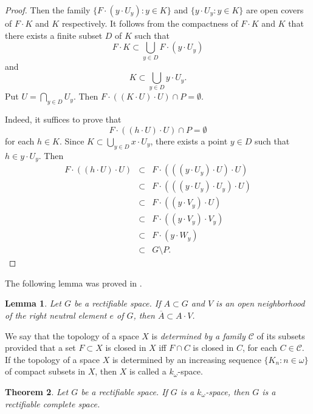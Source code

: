 \documentclass[psamsfonts,fceqn,leqno]{amsart}
\newtheorem{theorem}{Theorem}[section]
\newtheorem{lemma}[theorem]{Lemma}
\theoremstyle{definition}
\begin{document}
\begin{proof}
Then the family $\{F\cdot (y\cdot U_{y}): y\in K\}$ and $\{y\cdot U_{y}: y\in K\}$ are open covers of $F\cdot K$ and $K$ respectively.  It follows from the compactness of $F\cdot K$ and $K$ that there exists a finite subset $D$ of $K$ such that $$F\cdot K\subset \bigcup_{y\in D}F\cdot (y\cdot U_{y})$$ and $$K\subset  \bigcup_{y\in D}y\cdot U_{y}.$$ Put $U=\bigcap_{y\in D} U_{y}$. Then $F\cdot ((K\cdot U)\cdot U)\cap P=\emptyset.$

Indeed, it suffices to prove that $$F\cdot ((h\cdot U)\cdot U)\cap P=\emptyset$$ for each $h\in K$. Since $K\subset \bigcup_{y\in D}x\cdot U_{y}$, there exists a point $y\in D$ such that $h\in y\cdot U_{y}$. Then
\begin{eqnarray}
F\cdot ((h\cdot U)\cdot U)&\subset&F\cdot (((y\cdot U_{y})\cdot U)\cdot U) \nonumber\\
&\subset&F\cdot (((y\cdot U_{y})\cdot U_{y})\cdot U) \nonumber\\
&\subset&F\cdot ((y\cdot V_{y})\cdot U) \nonumber\\
&\subset&F\cdot ((y\cdot V_{y})\cdot V_{y}) \nonumber\\
&\subset&F\cdot (y\cdot W_{y}) \nonumber\\
&\subset&G\setminus P. \nonumber
\end{eqnarray}
\end{proof}

The following lemma was proved in \cite{PL}.

\begin{lemma}\label{dense}\cite{PL}
Let $G$ be a rectifiable space. If $A\subset G$ and $V$ is an open
neighborhood of the right neutral element $e$ of $G$, then $\overline{A}\subset A\cdot V$.
\end{lemma}

We say that the topology  of a space $X$ is {\it determined by a family $\mathscr{C}$} of its subsets provided that a set $F\subset X$ is closed in $X$ iff $F\cap C$ is closed in $C$, for each $C\in\mathscr{C}$. If the topology of a space $X$ is determined by an increasing sequence $\{K_{n}: n\in\omega\}$ of compact subsets in $X$, then $X$ is called a $k_{\omega}$-space.

\begin{theorem}
Let $G$ be a rectifiable space. If $G$ is a $k_{\omega}$-space, then $G$ is a rectifiable complete space.
\end{theorem}
\end{document}
